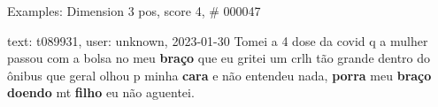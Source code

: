 \begin{frame}{Examples: Dimension 3 pos, score 4, \# 000047}
\footnotesize
\begin{exampleblock}{text: t089931, user: unknown, 2023-01-30}
Tomei a 4 dose da covid q a mulher passou com a bolsa no meu \textbf{braço} que 
eu gritei um crlh tão grande dentro do ônibus que geral olhou p minha 
\textbf{cara} e não entendeu nada, \textbf{porra} meu \textbf{braço} 
\textbf{doendo} mt \textbf{filho} eu não aguentei. 
\end{exampleblock}
\end{frame}
